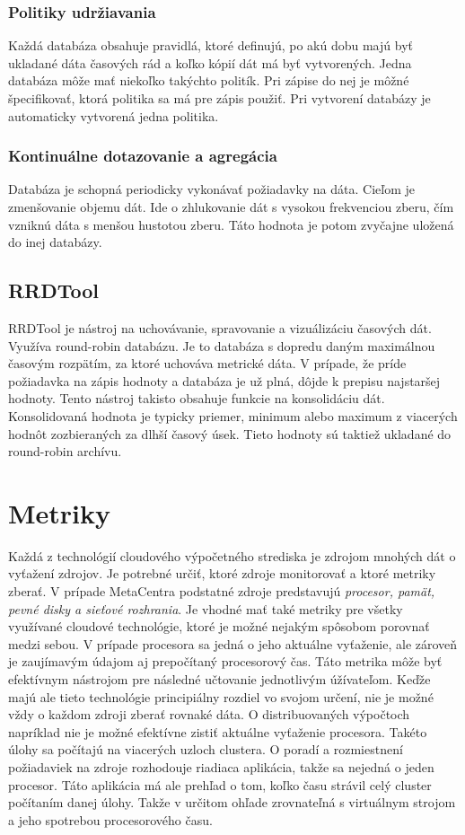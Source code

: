 \documentclass[11pt,final,oneside]{fithesis}
\begin{document}
\subsection{Politiky udržiavania}
Každá databáza obsahuje pravidlá, ktoré definujú, po akú dobu majú byť ukladané dáta časových rád a koľko kópií dát má byť vytvorených. Jedna databáza môže mať niekoľko takýchto politík. Pri zápise 
do nej je môžné špecifikovať, ktorá politika sa má pre zápis použiť. Pri vytvorení databázy je automaticky vytvorená jedna politika.

\subsection{Kontinuálne dotazovanie a agregácia}
Databáza je schopná periodicky vykonávať požiadavky na dáta. Cieľom je zmenšovanie objemu dát. Ide o zhlukovanie dát s vysokou frekvenciou zberu, čím vzniknú dáta s menšou hustotou zberu. Táto hodnota je 
potom zvyčajne uložená do inej databázy.

\section{RRDTool}
RRDTool je nástroj na uchovávanie, spravovanie a vizuálizáciu časových dát. Využíva round-robin databázu. Je to databáza s dopredu daným maximálnou časovým rozpätím, za ktoré uchováva metrické dáta.
V prípade, že príde požiadavka na zápis hodnoty 
a databáza je už plná, dôjde k prepisu najstaršej hodnoty. Tento nástroj takisto obsahuje funkcie na konsolidáciu dát. Konsolidovaná hodnota je typicky priemer, minimum alebo maximum z viacerých hodnôt zozbieraných 
za dlhší časový úsek. Tieto hodnoty sú taktiež ukladané do round-robin archívu.



\chapter{Metriky}
Každá z technológií cloudového výpočetného strediska je zdrojom mnohých dát o vyťažení zdrojov. Je potrebné určiť, ktoré zdroje monitorovať a ktoré metriky zberať. V prípade MetaCentra podstatné
zdroje predstavujú \emph{procesor, pamät, pevné disky a sieťové rozhrania}. Je vhodné mať také metriky pre všetky využívané cloudové technológie,
ktoré je možné nejakým spôsobom porovnať medzi sebou. V prípade procesora sa jedná o jeho aktuálne vyťaženie, ale zároveň je zaujímavým údajom aj prepočítaný procesorový čas. Táto metrika môže byť efektívnym
nástrojom pre následné učtovanie jednotlivým úžívateľom. Keďže majú ale tieto technológie principiálny rozdiel vo svojom určení, nie je možné vždy o každom zdroji zberať rovnaké dáta. 
O distribuovaných výpočtoch napríklad nie je možné efektívne zistiť aktuálne vyťaženie procesora. Takéto úlohy sa počítajú na viacerých uzloch clustera. O poradí a rozmiestnení požiadaviek na zdroje
rozhodouje riadiaca aplikácia, takže sa nejedná o jeden procesor. Táto aplikácia má ale prehľad o tom, koľko času strávil celý cluster počítaním danej úlohy. Takže v určitom ohľade zrovnateľná s virtuálnym
strojom a jeho spotrebou procesorového času.
\end{document}

